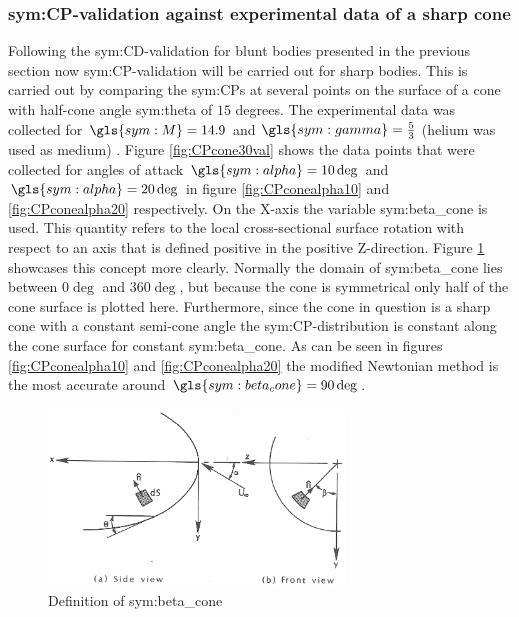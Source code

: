 \subsubsection{\gls{sym:CP}-validation against experimental data of a sharp cone}
\label{subsubsec:valsharpconeCP}
Following the \gls{sym:CD}-validation for blunt bodies presented in the previous section now \gls{sym:CP}-validation will be carried out for sharp bodies. This is carried out by comparing the \glspl{sym:CP} at several points on the surface of a cone with half-cone angle \gls{sym:theta} of $15$ degrees. The experimental data was collected for $\gls{sym:M}=14.9$ and $\gls{sym:gamma}=\frac{5}{3}$ (helium was used as medium) \cite{Bertin1994,Cleary1970}. Figure \ref{fig:CPcone30val} shows the data points that were collected for angles of attack $\gls{sym:alpha}=10\deg$ and $\gls{sym:alpha}=20\deg$ in figure \ref{fig:CPconealpha10} and \ref{fig:CPconealpha20} respectively. On the X-axis the variable \gls{sym:beta_cone} is used. This quantity refers to the local cross-sectional surface rotation with respect to an axis that is defined positive in the positive Z-direction. Figure \ref{fig:beta_cone} showcases this concept more clearly. Normally the domain of \gls{sym:beta_cone} lies between $0\deg$ and $360\deg$, but because the cone is symmetrical only half of the cone surface is plotted here. Furthermore, since the cone in question is a sharp cone with a constant semi-cone angle the \gls{sym:CP}-distribution is constant along the cone surface for constant \gls{sym:beta_cone}.
As can be seen in figures \ref{fig:CPconealpha10} and \ref{fig:CPconealpha20} the modified Newtonian method is the most accurate around $\gls{sym:beta_cone}=90\deg$.

\begin{figure}[h]
	\centering
	\includegraphics[width=0.7\textwidth]{./Figure/def_beta}
	\caption{Definition of \gls{sym:beta_cone} \cite{Bertin1994}}
	\label{fig:beta_cone}
\end{figure}

